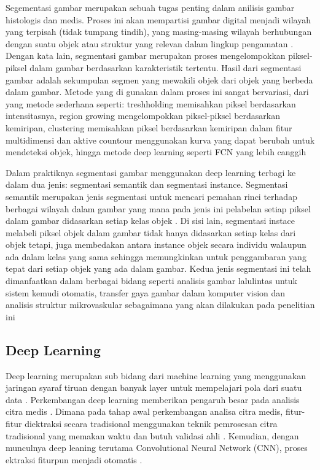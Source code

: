 \noindent Segementasi gambar merupakan sebuah tugas penting dalam anilisis gambar histologis dan medis. Proses ini akan mempartisi gambar digital menjadi wilayah yang terpisah (tidak tumpang tindih), yang masing-masing wilayah  berhubungan dengan suatu objek atau struktur yang relevan dalam lingkup pengamatan \cite{wu_image_2023}. Dengan kata lain, segmentasi gambar merupakan proses mengelompokkan piksel-piksel dalam gambar berdasarkan karakteristik tertentu. Hasil dari segmentasi gambar adalah sekumpulan segmen yang mewakili objek dari objek yang berbeda dalam gambar. Metode yang di gunakan dalam proses ini sangat bervariasi, dari yang metode sederhana seperti: treshholding memisahkan piksel berdasarkan intensitasnya, region growing mengelompokkan piksel-piksel berdasarkan kemiripan, clustering memisahkan piksel berdasarkan kemiripan dalam fitur multidimensi dan aktive countour menggunakan kurva yang dapat berubah untuk mendeteksi objek, hingga metode deep learning seperti FCN yang lebih canggih \cite{huang_fully_2022,wang_comprehensive_2022}

\noindent Dalam praktiknya segmentasi gambar menggunakan deep learning terbagi ke dalam dua jenis: segmentasi semantik dan segmentasi instance. Segmentasi semantik merupakan jenis segmentasi untuk mencari pemahan rinci terhadap berbagai wilayah dalam gambar yang mana pada jenis ini pelabelan setiap piksel dalam gambar didasarkan setiap kelas objek \cite{fan_image_2023}. Di sisi lain, segmentasi instace melabeli piksel objek dalam gambar tidak hanya didasarkan setiap kelas dari objek tetapi, juga membedakan antara instance objek  secara individu walaupun ada dalam kelas yang sama sehingga memungkinkan untuk penggambaran yang tepat dari setiap objek yang ada dalam gambar. Kedua jenis segmentasi ini telah dimanfaatkan dalam berbagai bidang seperti analisis gambar lalulintas untuk sistem kemudi otomatis, transfer gaya gambar dalam komputer vision dan analisis struktur mikrovaskular sebagaimana yang akan dilakukan pada penelitian ini \cite{wang_traffic_2023, zhang_image_2023, sultan_microvasculature_2023}


\subsection{Deep Learning}

\noindent Deep learning merupakan sub bidang dari machine learning yang menggunakan jaringan syaraf tiruan dengan banyak layer untuk mempelajari pola dari suatu data \cite{goodfellow_deep_2016,yang_deep_2023}. Perkembangan deep learning memberikan pengaruh besar pada analisis citra medis \cite{sistaninejhad_review_2023}. Dimana pada tahap awal perkembangan analisa citra medis, fitur-fitur diektraksi secara tradisional menggunakan teknik pemrosesan citra tradisional yang memakan waktu dan butuh validasi ahli \cite{huang_fully_2022}.  Kemudian, dengan munculnya deep leaning terutama Convolutional Neural Network (CNN), proses ektraksi fiturpun menjadi otomatis \cite{huang_fully_2022,azad_medical_2022}. 

